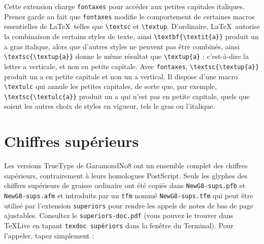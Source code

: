 \documentclass[12pt,english,french]{article}
\begin{document}
Cette extension charge \texttt{fontaxes} pour accéder aux petites capitales italiques. Prenez garde au fait que \texttt{fontaxes} modifie le comportement de certaines macros essentielles de \LaTeX\ telles que \verb+\textsc+ et \verb+\textup+. D'ordinaire, \LaTeX\ autorise la combinaison de certains styles de texte, ainsi \verb+\textbf{\textit{a}}+ produit un a gras italique, alors que d'autres styles ne peuvent pas être combinés, ainsi \verb+\textsc{\textup{a}}+ donne le même résultat que \verb+\textup{a}+ : c'est-à-dire la lettre a verticale, et non en petite capitale. Avec \texttt{fontaxes}, \verb+\textsc{\textup{a}}+ produit un a en petite capitale et non un a vertical. Il dispose d'une macro \verb+\textulc+ qui annule les petites capitales, de sorte que, par exemple, \verb+\textsc{\textulc{a}}+ produit un a qui n'est pas en petite capitale, quels que soient les autres choix de styles en vigueur, tels le gras ou l'italique.

\section{Chiffres supérieurs}


Les versions TrueType de GaramondNo8 ont un ensemble complet des chiffres supérieurs, contrairement à leurs homologues PostScript. Seuls les glyphes des chiffres supérieurs de graisse ordinaire ont été copiés dans \texttt{NewG8-sups.pfb} et \texttt{NewG8-sups.afm} et introduits par un \texttt{tfm} nommé \texttt{NewG8-sups.tfm} qui peut être utilisé par l'extension \texttt{superiors} pour rendre les appels de notes de bas de page ajustables. Consultez le \texttt{superiors-doc.pdf} (vous pouvez le trouver dans \TeX Live en tapant \texttt{texdoc supériors} dans la fenêtre du Terminal). Pour l'appeler, tapez simplement :
\end{document}
